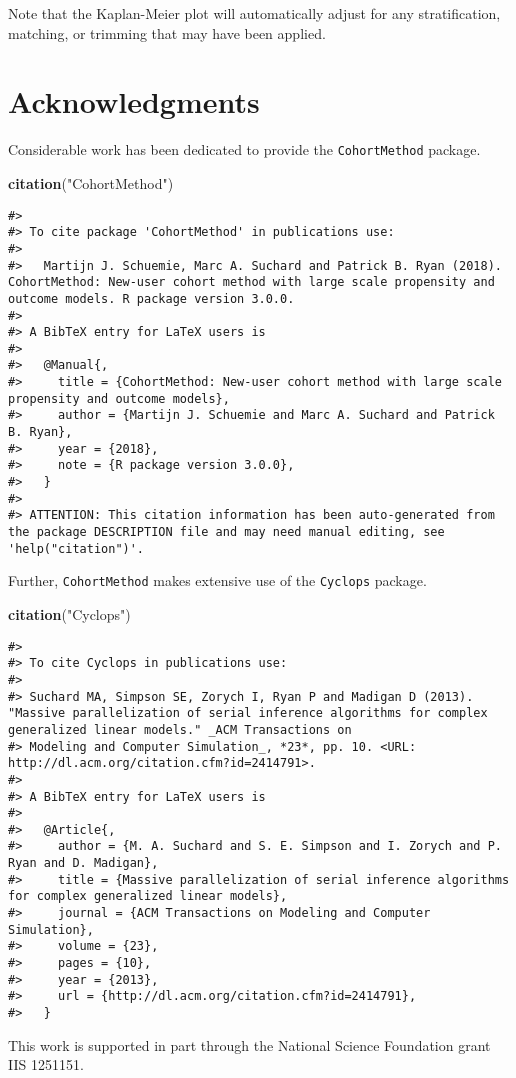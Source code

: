 \documentclass[]{article}
\newenvironment{Shaded}{\begin{snugshade}}{\end{snugshade}}
\newcommand{\KeywordTok}[1]{\textcolor[rgb]{0.13,0.29,0.53}{\textbf{#1}}}
\newcommand{\NormalTok}[1]{#1}
\newcommand{\StringTok}[1]{\textcolor[rgb]{0.31,0.60,0.02}{#1}}
\begin{document}
Note that the Kaplan-Meier plot will automatically adjust for any
stratification, matching, or trimming that may have been applied.

\hypertarget{acknowledgments}{%
\section{Acknowledgments}\label{acknowledgments}}

Considerable work has been dedicated to provide the
\texttt{CohortMethod} package.

\begin{Shaded}
\begin{Highlighting}[]
\KeywordTok{citation}\NormalTok{(}\StringTok{"CohortMethod"}\NormalTok{)}
\end{Highlighting}
\end{Shaded}

\begin{verbatim}
#> 
#> To cite package 'CohortMethod' in publications use:
#> 
#>   Martijn J. Schuemie, Marc A. Suchard and Patrick B. Ryan (2018). CohortMethod: New-user cohort method with large scale propensity and outcome models. R package version 3.0.0.
#> 
#> A BibTeX entry for LaTeX users is
#> 
#>   @Manual{,
#>     title = {CohortMethod: New-user cohort method with large scale propensity and outcome models},
#>     author = {Martijn J. Schuemie and Marc A. Suchard and Patrick B. Ryan},
#>     year = {2018},
#>     note = {R package version 3.0.0},
#>   }
#> 
#> ATTENTION: This citation information has been auto-generated from the package DESCRIPTION file and may need manual editing, see 'help("citation")'.
\end{verbatim}

Further, \texttt{CohortMethod} makes extensive use of the
\texttt{Cyclops} package.

\begin{Shaded}
\begin{Highlighting}[]
\KeywordTok{citation}\NormalTok{(}\StringTok{"Cyclops"}\NormalTok{)}
\end{Highlighting}
\end{Shaded}

\begin{verbatim}
#> 
#> To cite Cyclops in publications use:
#> 
#> Suchard MA, Simpson SE, Zorych I, Ryan P and Madigan D (2013). "Massive parallelization of serial inference algorithms for complex generalized linear models." _ACM Transactions on
#> Modeling and Computer Simulation_, *23*, pp. 10. <URL: http://dl.acm.org/citation.cfm?id=2414791>.
#> 
#> A BibTeX entry for LaTeX users is
#> 
#>   @Article{,
#>     author = {M. A. Suchard and S. E. Simpson and I. Zorych and P. Ryan and D. Madigan},
#>     title = {Massive parallelization of serial inference algorithms for complex generalized linear models},
#>     journal = {ACM Transactions on Modeling and Computer Simulation},
#>     volume = {23},
#>     pages = {10},
#>     year = {2013},
#>     url = {http://dl.acm.org/citation.cfm?id=2414791},
#>   }
\end{verbatim}

This work is supported in part through the National Science Foundation
grant IIS 1251151.
\end{document}
